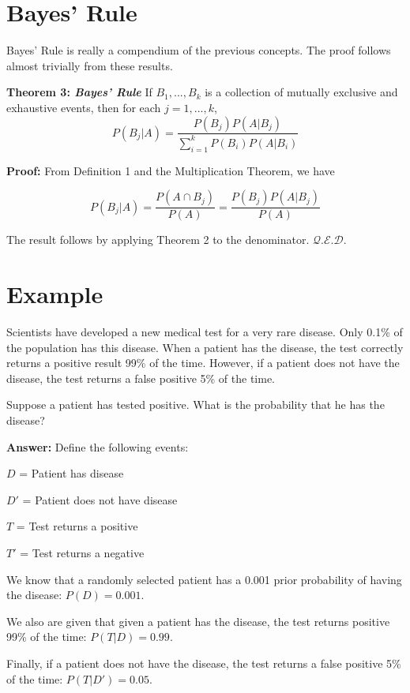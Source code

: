 \documentclass{article}
\newenvironment{proof} {\textbf{Proof:} \newline} {\hfill
  $\mathcal{Q.E.D.}$}
\newenvironment{thm}[2][]{\vspace{0.2cm} \textbf{Theorem #2:
    \textit{#1}} \newline}{}
\begin{document}
  
\section{Bayes' Rule}

Bayes' Rule is really a compendium of the previous
concepts. The proof follows almost trivially from these
results.

\begin{thm}[Bayes' Rule]{3}
  If $B_1, ..., B_k$ is a collection of mutually exclusive and
  exhaustive events, then for each $j = 1, ..., k$, $$P(B_j|A) =
  \frac{P(B_j)P(A|B_j)}{\sum_{i=1}^k P(B_i)P(A|B_i)}$$
\end{thm}

\begin{proof}
  From Definition 1 and the Multiplication Theorem, we have

  $$P(B_j|A) = \frac{P(A \cap B_j)}{P(A)} =
  \frac{P(B_j)P(A|B_j)}{P(A)}$$

  The result follows by applying Theorem 2 to the
  denominator.
\end{proof}


\section{Example}
Scientists have developed a new medical test for a very rare
disease. Only 0.1\% of the population has this disease. When
a patient has the disease, the test correctly returns a
positive result 99\% of the time. However, if a patient does
not have the disease, the test returns a false positive 5\%
of the time.

Suppose a patient has tested positive. What is the
probability that he has the disease?

\vspace{0.5cm}
\textbf{Answer:}
Define the following events:

\quad $D$ = Patient has disease

\quad $D'$ = Patient does not have disease

\quad $T$ = Test returns a positive

\quad $T'$ = Test returns a negative


We know that a randomly selected patient has a 0.001 prior
probability of having the disease: $P(D) = 0.001$.

We also are given that given a patient has the disease, the
test returns positive 99\% of the time: $P(T|D) = 0.99$.

Finally, if a patient does not have the disease, the test
returns a false positive 5\% of the time: $P(T|D') = 0.05$.
\end{document}
